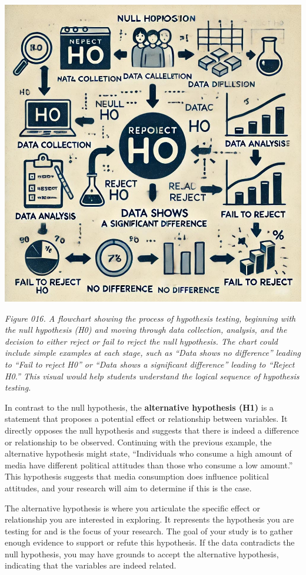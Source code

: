 \documentclass[
]{book}
\begin{document}
\includegraphics[width=1\textwidth,height=\textheight]{images/fig016.jpg}

\emph{Figure 016. A flowchart showing the process of hypothesis testing, beginning with the null hypothesis (H0) and moving through data collection, analysis, and the decision to either reject or fail to reject the null hypothesis. The chart could include simple examples at each stage, such as ``Data shows no difference'' leading to ``Fail to reject H0'' or ``Data shows a significant difference'' leading to ``Reject H0.'' This visual would help students understand the logical sequence of hypothesis testing.}

In contrast to the null hypothesis, the \textbf{alternative hypothesis (H1)} is a statement that proposes a potential effect or relationship between variables. It directly opposes the null hypothesis and suggests that there is indeed a difference or relationship to be observed. Continuing with the previous example, the alternative hypothesis might state, ``Individuals who consume a high amount of media have different political attitudes than those who consume a low amount.'' This hypothesis suggests that media consumption does influence political attitudes, and your research will aim to determine if this is the case.

The alternative hypothesis is where you articulate the specific effect or relationship you are interested in exploring. It represents the hypothesis you are testing for and is the focus of your research. The goal of your study is to gather enough evidence to support or refute this hypothesis. If the data contradicts the null hypothesis, you may have grounds to accept the alternative hypothesis, indicating that the variables are indeed related.
\end{document}
